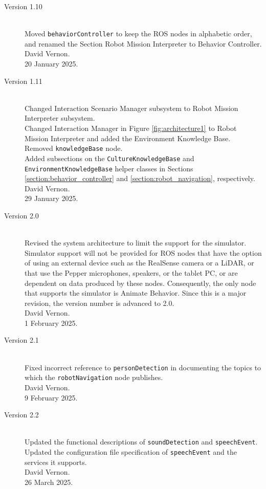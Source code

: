 \documentclass{CSSRforAfrica}
\begin{document}
{{\begin{description}
\item [Version 1.10]~\\
Moved {\small \verb+behaviorController+ } to keep the ROS nodes in alphabetic order, and renamed the Section Robot Mission Interpreter to Behavior Controller.\\
David Vernon. \\                          
20 January 2025.

\item [Version 1.11]~\\
Changed Interaction Scenario Manager subsystem to Robot Mission Interpreter subsystem. \\
Changed Interaction Manager in Figure \ref{fig:architecture1} to Robot Mission Interpreter and added the Environment Knowledge Base.\\
Removed {\small \verb+knowledgeBase+ } node.\\
Added subsections on the  {\small \verb+CultureKnowledgeBase+} and {\small \verb+EnvironmentKnowledgeBase+} helper classes in Sections \ref{section:behavior_controller} and \ref{section:robot_navigation}, respectively.\\
David Vernon. \\                          
29 January 2025.

\item [Version 2.0]~\\
Revised the system architecture to limit the support for the simulator.  Simulator support will not be provided for  ROS nodes that have the option of using an external device such as the RealSense camera or a LiDAR, or that use the Pepper microphones, speakers, or the tablet PC, or are dependent on data produced by these nodes. Consequently, the only node that supports the simulator is Animate Behavior.
Since this is a major revision, the version number is advanced to 2.0.\\
David Vernon.\\
1 February 2025.

\item [Version 2.1]~\\
Fixed incorrect reference to {\small \verb+personDetection+} in documenting the topics to which the {\small \verb+robotNavigation+} node publishes.\\
David Vernon.\\
9 February 2025.

\item [Version 2.2]~\\
Updated the functional descriptions of   {\small \verb+soundDetection+} and  {\small \verb+speechEvent+}.  Updated the configuration file specification of  {\small \verb+speechEvent+} and the services it supports. \\
David Vernon.\\
26 March 2025.


\end{description}}}
\end{document}
